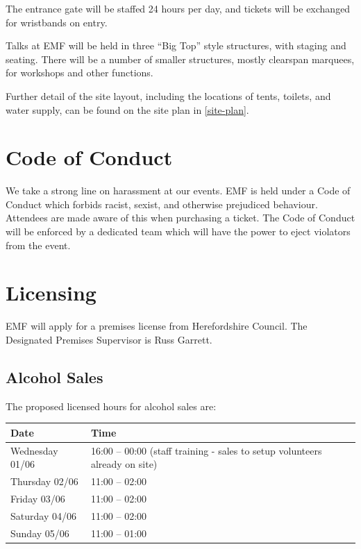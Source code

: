 The entrance gate will be staffed 24 hours per day, and tickets will be
exchanged for wristbands on entry.

Talks at EMF will be held in three ``Big Top'' style structures, with staging and
seating. There will be a number of smaller structures, mostly clearspan marquees,
for workshops and other functions.

Further detail of the site layout, including the locations of tents, toilets,
and water supply, can be found on the site plan in \cref{site-plan}.

\section{Code of Conduct}

We take a strong line on harassment at our events. EMF is held under a
Code of Conduct which forbids racist, sexist, and otherwise prejudiced behaviour.
Attendees are made aware of this when purchasing a ticket. The Code of Conduct
will be enforced by a dedicated team which will have the power to eject violators
from the event.

\newpage

\section{Licensing}

EMF will apply for a premises license from Herefordshire Council.
The Designated Premises Supervisor is Russ Garrett.

\subsection{Alcohol Sales}

The proposed licensed hours for alcohol sales are:

\begin{table}[h!]
    \centering
    \begin{tabular}{| l l |}
        \hline
        \textbf{Date} & \textbf{Time} \\
        \hline
	    Wednesday 01/06 & 16:00 -- 00:00 (staff training - sales to setup volunteers already on site)  \\
        Thursday 02/06 & 11:00 -- 02:00 \\
        Friday 03/06 & 11:00 -- 02:00 \\
        Saturday 04/06 & 11:00 -- 02:00 \\
        Sunday 05/06 & 11:00 -- 01:00 \\
        \hline
    \end{tabular}
    \centering
\end{table}


